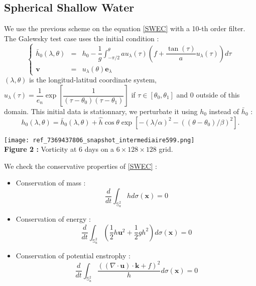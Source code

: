 \documentclass{sciposter}
\def\gint{\displaystyle\int}
\begin{document}
\begin{multicols}{3}
\section{Spherical Shallow Water}
We use the previous scheme on the equation \eqref{SWEC} with a 10-th order filter. The Galewsky test case \cite{G2004} uses the initial condition :
\begin{equation}
\left\lbrace
\begin{array}{rcl}
\bar{h}_0(\lambda, \theta) & = & h_0 - \dfrac{1}{g} \gint_{-\pi/2}^{\theta} a u_{\lambda}(\tau) 
\left( f + \dfrac{\tan(\tau)}{a}u_{\lambda}(\tau) \right) d\tau\\
\mathbf{v} & = & u_{\lambda}(\theta) \mathbf{e}_{\lambda}
\end{array}
\right.
\end{equation}
$(\lambda, \theta)$ is the longitud-latitud coordinate system, $u_{\lambda}(\tau) = \dfrac{1}{e_n} \exp \left[ \dfrac{1}{(\tau - \theta_0)(\tau - \theta_1)} \right] $ if $\tau \in [ \theta_0, \theta_1]$ and $0$ outside of this domain. This initial data is stationnary, we perturbate it using $h_0$ instead of $\bar{h}_0$ :
\begin{equation}
h_0(\lambda, \theta) = \bar{h}_0(\lambda, \theta ) + \hat{h} \cos \theta \exp \left[ - (\lambda/\alpha)^2 - ((\theta-\theta_0)/\beta)^2 \right].
\end{equation}

\begin{center}
\texttt{[image: ref\_7369437806\_snapshot\_intermediaire599.png]}\\

\textbf{Figure 2 : } Vorticity at $6$ days on a $6 \times 128 \times 128$ grid.
\end{center}

We check the conservative properties of \eqref{SWEC} :
\begin{itemize}
\item Conservation of mass :
\begin{equation}
\dfrac{d}{dt} \gint_{\mathbb{S}_a^2} h d \sigma(\mathbf{x}) = 0
\end{equation}
\item Conservation of energy :
\begin{equation}
\dfrac{d}{dt} \gint_{\mathbb{S}_a^2} \left( \dfrac{1}{2} h \mathbf{u}^2 + \dfrac{1}{2} g h^2 \right)d \sigma(\mathbf{x}) = 0
\end{equation}
\item Conservation of potential enstrophy :
\begin{equation}
\dfrac{d}{dt} \gint_{\mathbb{S}_a^2} \dfrac{\left( (\nabla \cdot \mathbf{u}) \cdot \mathbf{k} + f \right)^2}{h} d \sigma(\mathbf{x}) = 0
\end{equation}
\end{itemize}




\end{multicols}
\end{document}
